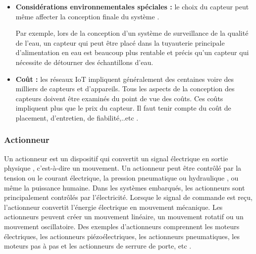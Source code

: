 \begin{itemize}
\item \textbf{Considérations environnementales spéciales :} le choix du capteur peut même affecter la conception finale du système \cite{kelly2013towards}.


Par exemple, lors de la conception d'un système de surveillance de la qualité de l'eau, un capteur qui peut être placé dans la tuyauterie principale d'alimentation en eau est beaucoup plus rentable et précis qu'un capteur qui nécessite de détourner des échantillons d'eau.

\item \textbf{Coût :} les réseaux IoT impliquent généralement des centaines voire des milliers de capteurs et d'appareils. Tous les aspects de la conception des capteurs doivent être examinés du point de vue des coûts. Ces coûts impliquent plus que le prix du capteur. Il faut tenir compte du coût de placement, d'entretien, de fiabilité,..etc \cite{mhatre2005minimum}.
\end{itemize}

\subsubsection{Actionneur}
Un actionneur est un dispositif qui convertit un signal électrique en sortie physique \cite{wirtz2018brave}, c'est-à-dire un mouvement. Un actionneur peut être contrôlé par la tension ou le courant électrique, la pression pneumatique ou hydraulique \cite{arauz2013actuator}, ou même la puissance humaine. Dans les systèmes embarqués, les actionneurs sont principalement contrôlés par l'électricité. Lorsque le signal de commande est reçu, l'actionneur convertit l'énergie électrique en mouvement mécanique. Les actionneurs peuvent créer un mouvement linéaire, un mouvement rotatif ou un mouvement oscillatoire. Des exemples d'actionneurs comprennent les moteurs électriques, les actionneurs piézoélectriques, les actionneurs pneumatiques, les moteurs pas à pas et les actionneurs de serrure de porte, etc \cite{ham2009compliant}.
